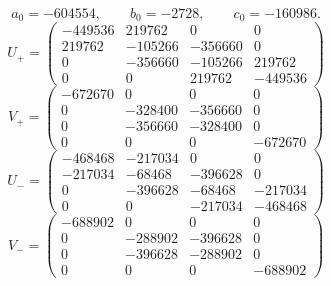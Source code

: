 \begin{equation*}
a_0=-604554,\qquad b_0=-2728,\qquad c_0=-160986.
\end{equation*}
\begin{equation*}
U_{+}=\begin{pmatrix}
-449536 & 219762 & 0 & 0 \\
219762 & -105266 & -356660 & 0 \\
0 & -356660 & -105266 & 219762 \\
0 & 0 & 219762 & -449536
\end{pmatrix}
\end{equation*}
\begin{equation*}
V_{+}=\begin{pmatrix}
-672670 & 0 & 0 & 0 \\
0 & -328400 & -356660 & 0 \\
0 & -356660 & -328400 & 0 \\
0 & 0 & 0 & -672670
\end{pmatrix}
\end{equation*}
\begin{equation*}
U_{-}=\begin{pmatrix}
-468468 & -217034 & 0 & 0 \\
-217034 & -68468 & -396628 & 0 \\
0 & -396628 & -68468 & -217034 \\
0 & 0 & -217034 & -468468
\end{pmatrix}
\end{equation*}
\begin{equation*}
V_{-}=\begin{pmatrix}
-688902 & 0 & 0 & 0 \\
0 & -288902 & -396628 & 0 \\
0 & -396628 & -288902 & 0 \\
0 & 0 & 0 & -688902
\end{pmatrix}
\end{equation*}
